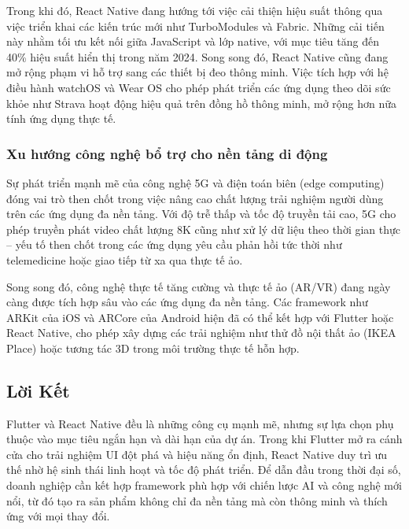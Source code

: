\indent Trong khi đó, React Native đang hướng tới việc cải thiện hiệu suất thông qua việc triển khai các kiến trúc mới như TurboModules và Fabric. Những cải tiến này nhằm tối ưu kết nối giữa JavaScript và lớp native, với mục tiêu tăng đến 40\% hiệu suất hiển thị trong năm 2024. Song song đó, React Native cũng đang mở rộng phạm vi hỗ trợ sang các thiết bị đeo thông minh. Việc tích hợp với hệ điều hành watchOS và Wear OS cho phép phát triển các ứng dụng theo dõi sức khỏe như Strava hoạt động hiệu quả trên đồng hồ thông minh, mở rộng hơn nữa tính ứng dụng thực tế.

\subsubsection{Xu hướng công nghệ bổ trợ cho nền tảng di động}

\indent Sự phát triển mạnh mẽ của công nghệ 5G và điện toán biên (edge computing) đóng vai trò then chốt trong việc nâng cao chất lượng trải nghiệm người dùng trên các ứng dụng đa nền tảng. Với độ trễ thấp và tốc độ truyền tải cao, 5G cho phép truyền phát video chất lượng 8K cũng như xử lý dữ liệu theo thời gian thực – yếu tố then chốt trong các ứng dụng yêu cầu phản hồi tức thời như telemedicine hoặc giao tiếp từ xa qua thực tế ảo.

\indent Song song đó, công nghệ thực tế tăng cường và thực tế ảo (AR/VR) đang ngày càng được tích hợp sâu vào các ứng dụng đa nền tảng. Các framework như ARKit của iOS và ARCore của Android hiện đã có thể kết hợp với Flutter hoặc React Native, cho phép xây dựng các trải nghiệm như thử đồ nội thất ảo (IKEA Place) hoặc tương tác 3D trong môi trường thực tế hỗn hợp.

\subsection{Lời Kết}

\indent Flutter và React Native đều là những công cụ mạnh mẽ, nhưng sự lựa chọn phụ thuộc vào mục tiêu ngắn hạn và dài hạn của dự án. Trong khi Flutter mở ra cánh cửa cho trải nghiệm UI đột phá và hiệu năng ổn định, React Native duy trì ưu thế nhờ hệ sinh thái linh hoạt và tốc độ phát triển. Để dẫn đầu trong thời đại số, doanh nghiệp cần kết hợp framework phù hợp với chiến lược AI và công nghệ mới nổi, từ đó tạo ra sản phẩm không chỉ đa nền tảng mà còn thông minh và thích ứng với mọi thay đổi.
